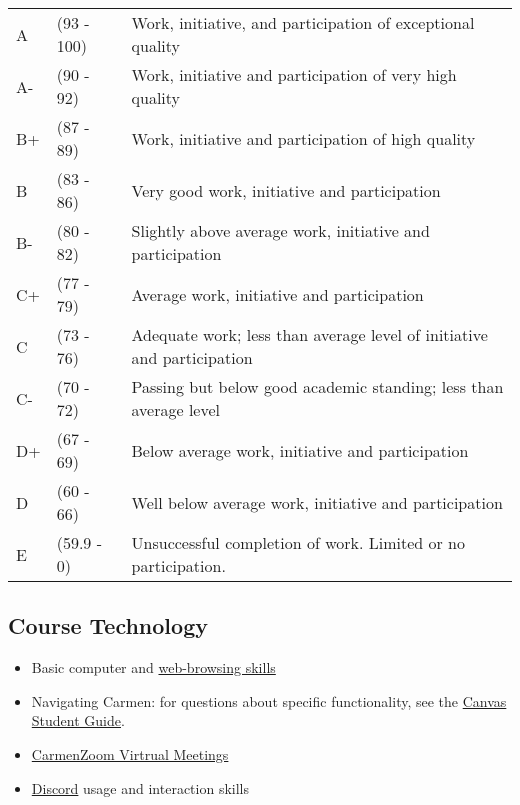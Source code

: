 \begin{tabularx}{\textwidth}{@{}l @{}l X@{}}
      A \hspace*{1em} & (93 - 100) & Work, initiative, and participation of exceptional quality             \\
      A-              & (90 - 92)  & Work, initiative and participation of very high quality                \\
      B+              & (87 - 89)  & Work, initiative and participation of high quality                     \\
      B               & (83 - 86)  & Very good work, initiative and participation                           \\
      B-              & (80 - 82)  & Slightly above average work, initiative and participation              \\
      C+              & (77 - 79)  & Average work, initiative and participation                             \\
      C               & (73 - 76)  & Adequate work; less than average level of initiative and participation \\
      C-              & (70 - 72)  & Passing but below good academic standing; less than average level      \\
      D+              & (67 - 69)  & Below average work, initiative and participation                       \\
      D               & (60 - 66)  & Well below average work, initiative and participation                  \\
      E               & (59.9 - 0) & Unsuccessful completion of work. Limited or no participation.
\end{tabularx}


\subsection{Course Technology}

\begin{itemize}
      \tightlist
      \item Basic computer and \href{https://lmgtfy.com/}{web-browsing skills}
      \item Navigating Carmen: for questions about specific functionality, see the \href{https://community.canvaslms.com/docs/DOC-10701}{Canvas Student Guide}.
      \item \href{https://go.osu.edu/Bqdx}{CarmenZoom Virtrual Meetings}
      \item \href{http://discordapp.com/}{Discord} usage and interaction skills
\end{itemize}

